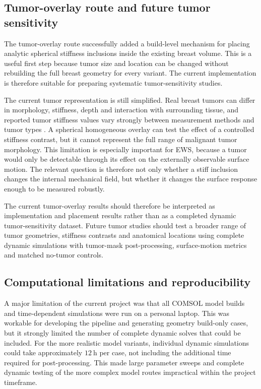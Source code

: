 
\subsection{Tumor-overlay route and future tumor sensitivity}
\label{discussion_tumor_overlay_future_sensitivity}

The tumor-overlay route successfully added a build-level mechanism for placing analytic spherical stiffness inclusions inside the existing breast volume. This is a useful first step because tumor size and location can be changed without rebuilding the full breast geometry for every variant. The current implementation is therefore suitable for preparing systematic tumor-sensitivity studies.

The current tumor representation is still simplified. Real breast tumors can differ in morphology, stiffness, depth and interaction with surrounding tissue, and reported tumor stiffness values vary strongly between measurement methods and tumor types \cite{Samani2007,McKnight2002,Patel2021,Patel2022}. A spherical homogeneous overlay can test the effect of a controlled stiffness contrast, but it cannot represent the full range of malignant tumor morphology. This limitation is especially important for EWS, because a tumor would only be detectable through its effect on the externally observable surface motion. The relevant question is therefore not only whether a stiff inclusion changes the internal mechanical field, but whether it changes the surface response enough to be measured robustly.

The current tumor-overlay results should therefore be interpreted as implementation and placement results rather than as a completed dynamic tumor-sensitivity dataset. Future tumor studies should test a broader range of tumor geometries, stiffness contrasts and anatomical locations using complete dynamic simulations with tumor-mask post-processing, surface-motion metrics and matched no-tumor controls.


\subsection{Computational limitations and reproducibility}
\label{discussion_computational_limitations_reproducibility}

A major limitation of the current project was that all COMSOL model builds and time-dependent simulations were run on a personal laptop. This was workable for developing the pipeline and generating geometry build-only cases, but it strongly limited the number of complete dynamic solves that could be included. For the more realistic model variants, individual dynamic simulations could take approximately $12~\mathrm{h}$ per case, not including the additional time required for post-processing. This made large parameter sweeps and complete dynamic testing of the more complex model routes impractical within the project timeframe.

